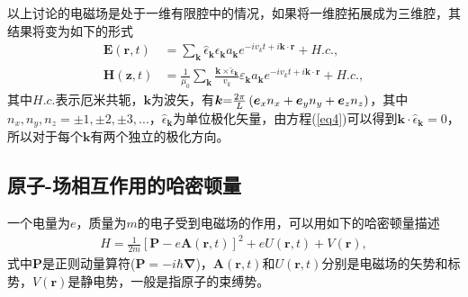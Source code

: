 以上讨论的电磁场是处于一维有限腔中的情况，如果将一维腔拓展成为三维腔，其结果将变为如下的形式
\begin{align}
\bm{ E}\left( {\bm{ r},t} \right)& = \sum\limits_{\bm{ k}} {{{\hat\epsilon }_{\bm{ k}}}{\epsilon_{\bm{ k}}}{a_{\bm{ k}}}{e^{ - i{v_{k}}t + i\bm{ k} \cdot\bm{r}}} + H.c.} ,\label{eq23}\\
\bm{ H}\left( {\bm{ z},t} \right)& = \frac{1}{{{\mu _0}}}\sum\limits_{\bm{ k}} {\frac{{\bm{ k} \times {{\hat \epsilon}_{\bm{ k}}}}}{{{v_k}}}{\varepsilon _{\bm{ k}}}{a_{\bm{ k}}}{e^{ - i{v_k}t + i\bm{ k} \cdot \bm{r}}} + H.c.} , \label{eq24}
\end{align}
其中$H.c.$表示厄米共轭，$\bm{ k}$为波矢，有$\bm{ k}{\rm{ = }}\frac{{2\pi }}{L}\left( {{{\bm{ e}}_x}{n_x} + {{\bm{ e}}_y}{n_y} + {{\bm{ e}}_z}{n_z}} \right)$，其中$n_x,n_y,n_z =  \pm 1, \pm 2, \pm 3,...$，${\hat \epsilon_{\bm{ k}}}$为单位极化矢量，由方程(\ref{eq4})可以得到$\bm{k} \cdot {\hat \epsilon_{\bm{ k}}} = 0$，所以对于每个$\bm{k}$有两个独立的极化方向。

\subsection{原子-场相互作用的哈密顿量}\label{subsection21}

一个电量为$e$，质量为$m$的电子受到电磁场的作用，可以用如下的哈密顿量描述
\begin{align}
H = \frac{1}{{2m}}{\left[ {\bm{P} - e\bm{A}(\bm{r},t)} \right]^2} + eU(\bm{r},t) + V(\bm{r}),\label{eq25}
\end{align}
式中$\bm{P}$是正则动量算符($\bm{P} =  - i\hbar \bm{\nabla} $)，$\bm{A}(\bm{r},t)$和$U(\bm{r},t)$分别是电磁场的矢势和标势，$V(\bm{r})$是静电势，一般是指原子的束缚势。

